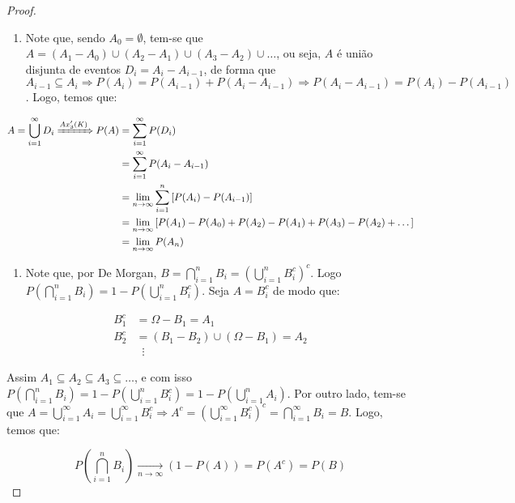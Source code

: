 \documentclass[
]{article}
\providecommand{\tightlist}{%
  \setlength{\itemsep}{0pt}\setlength{\parskip}{0pt}}
\theoremstyle{definition}
\theoremstyle{definition}
\theoremstyle{definition}
\theoremstyle{definition}
\theoremstyle{remark}
\begin{document}
\begin{proof}
\leavevmode

\begin{enumerate}
\def\labelenumi{\arabic{enumi}.}
\tightlist
\item
  Note que, sendo \(A_{0} = \emptyset\), tem-se que \(A = (A_{1} - A_{0}) \cup (A_{2} - A_{1}) \cup (A_{3} - A_{2}) \cup \dots\), ou seja, \(A\) é união disjunta de eventos \(D_{i} = A_{i} - A_{i-1}\), de forma que \(A_{i-1} \subseteq A_{i} \Rightarrow P(A_{i}) = P(A_{i-1}) + P(A_{i} - A_{i-1}) \Rightarrow P(A_{i} - A_{i-1}) = P(A_{i}) - P(A_{i-1})\). Logo, temos que:
\end{enumerate}

\begin{align*}
A = \bigcup_{i=1}^{\infty}D_{i} \xRightarrow{Ax'_{3}(K)} P(A) &= \sum_{i=1}^{\infty}P(D_{i})\\
&= \sum_{i=1}^{\infty}P(A_{i} - A_{i-1})\\
&= \lim_{n \to \infty} \sum_{i=1}^{n} \left[P(A_{i}) - P(A_{i-1})\right] \\
&= \lim_{n \to \infty} \left[P(A_{1}) - P(A_{0}) + P(A_{2}) - P(A_{1}) + P(A_{3}) - P(A_{2}) + \dots\right]\\
&= \lim_{n \to \infty} P(A_{n})
\end{align*}

\begin{enumerate}
\def\labelenumi{\arabic{enumi}.}
\setcounter{enumi}{1}
\tightlist
\item
  Note que, por De Morgan, \(B = \bigcap_{i=1}^{n}B_{i} = \left(\bigcup_{i=1}^{n}B_{i}^{c}\right)^{c}\). Logo \(P(\bigcap_{i=1}^{n}B_{i}) = 1 - P(\bigcup_{i = 1}^{n}B_{i}^{c})\). Seja \(A = B_{i}^{c}\) de modo que:
\end{enumerate}

\begin{align*}
B_{1}^{c} &= \Omega - B_{1} = A_1 \\
B_{2}^{c} &= (B_{1} - B_{2}) \cup (\Omega - B_{1}) = A_{2} \\
&\;\;\vdots
\end{align*}

Assim \(A_{1} \subseteq A_{2} \subseteq A_{3} \subseteq \dots\), e com isso \(P(\bigcap_{i=1}^{n}B_{i}) = 1 - P(\bigcup_{i=1}^{n}B_{i}^{c}) = 1 - P(\bigcup_{i = 1}^{n}A_{i})\). Por outro lado, tem-se que \(A = \bigcup_{i = 1}^{\infty}A_{i} = \bigcup_{i=1}^{\infty}B_{i}^{c} \Rightarrow A^{c} = \left(\bigcup_{i=1}^{\infty}B_{i}^{c}\right)^{c} = \bigcap_{i=1}^{\infty} B_{i} = B\). Logo, temos que:

\[
P\left(\bigcap_{i=1}^{n}B_{i}\right) \xrightarrow[n \to \infty]{} (1 - P(A)) = P(A^{c}) = P(B)
\]

\end{proof}
\end{document}
